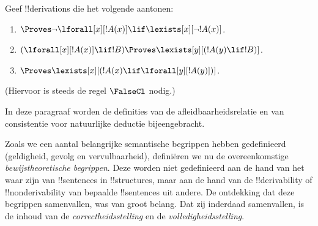 \documentclass[openany]{memoir}
\begin{document}
\begin{prob}
Geef !!{derivation}s die het volgende aantonen:
\begin{enumerate}
\item $\Proves \lnot\lforall[x][!A(x)] \lif \lexists[x][\lnot!A(x)]$.
\item $(\lforall[x][!A(x)] \lif !B) \Proves \lexists[y][(!A(y) \lif !B)]$.
\item $\Proves \lexists[x][(!A(x) \lif \lforall[y][!A(y)])]$.
\end{enumerate}
(Hiervoor is steeds de regel $\FalseCl$ nodig.)
\end{prob}
\endgroup

\begingroup
\def\olfilename{OLP-0091}
\def\olfilepath{content/first-order-logic/natural-deduction/}
\hypertarget{unit-OLP-0091}{}



      {}
      {}


\begin{editorial}
In deze paragraaf worden de definities van de afleidbaarheidsrelatie
en van consistentie voor natuurlijke deductie bijeengebracht.
\end{editorial}

\begin{explain}
Zoals we een aantal belangrijke semantische begrippen hebben
gedefinieerd (geldigheid, gevolg en vervulbaarheid), definiëren we nu
de overeenkomstige \emph{bewijstheoretische begrippen}. Deze worden
niet gedefinieerd aan de hand van het waar zijn van !!{sentence}s in
!!{structure}s, maar aan de hand van de !!{derivability} of
!!{nonderivability} van bepaalde !!{sentence}s uit andere. De
ontdekking dat deze begrippen samenvallen, was van groot belang. Dat
zij inderdaad samenvallen, is de inhoud van de
\emph{correctheidsstelling} en de \emph{volledigheidsstelling}.
\end{explain}
\end{document}
